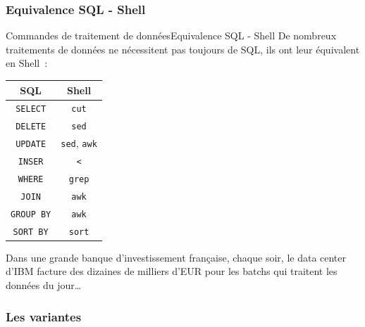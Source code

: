 \documentclass{beamer}
\begin{document}
    \subsubsection{Equivalence SQL - Shell}\label{subsubsec:equi-sql-shell}
    \begin{frame}{Commandes de traitement de données}{Equivalence SQL - Shell}
        De nombreux traitements de données ne nécessitent pas toujours de SQL, ils ont leur équivalent en Shell~:
        \begin{table}[ht]
            \centering
            \begin{tabular}{|c|c|}
                \hline
                \textbf{SQL}         & \textbf{Shell}                   \\
                \hline
                \lstinline{SELECT}   & \lstinline{cut}                  \\
                \hline
                \lstinline{DELETE}   & \lstinline{sed}                  \\
                \hline
                \lstinline{UPDATE}   & \lstinline{sed}, \lstinline{awk} \\
                \hline
                \lstinline{INSER}    & \lstinline{<}                    \\
                \hline
                \lstinline{WHERE}    & \lstinline{grep}                 \\
                \hline
                \lstinline{JOIN}     & \lstinline{awk}                  \\
                \hline
                \lstinline{GROUP BY} & \lstinline{awk}                  \\
                \hline
                \lstinline{SORT BY}  & \lstinline{sort}                 \\
                \hline
            \end{tabular}
        \end{table}
        Dans une grande banque d'investissement française, chaque soir, le data center d'IBM facture des dizaines de milliers d'EUR pour les batchs qui traitent les données du jour\ldots
    \end{frame}

    \subsubsection{Les variantes}\label{subsubsec:variantes}
\end{document}
